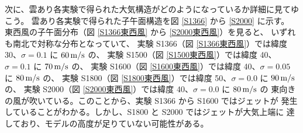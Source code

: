 \documentclass[body]{subfiles}
\begin{document}
次に、雲あり各実験で得られた大気構造がどのようになっているか詳細に見てゆこう。
雲あり各実験で得られた子午面構造を図 \ref{S1366} から \ref{S2000} に示す。
東西風の子午面分布（図 \ref{S1366東西風} から \ref{S2000東西風}）を見ると、
いずれも南北で対称な分布となっていて、
実験 S1366（図 \ref{S1366東西風}）では緯度 30\textdegree 、\(\sigma=0.1\) に \(60\hmu{m/s}\) の、
実験 S1500（図 \ref{S1500東西風}）では緯度 40\textdegree 、\(\sigma=0.1\) に \(70\hmu{m/s}\) の、
実験 S1600（図 \ref{S1600東西風}）では緯度 40\textdegree 、\(\sigma=0.05\) に \(80\hmu{m/s}\) の、
実験 S1800（図 \ref{S1800東西風}）では緯度 50\textdegree 、\(\sigma=0.0\) に \(90\hmu{m/s}\) の、
実験 S2000（図 \ref{S2000東西風}）では緯度 40\textdegree 、\(\sigma=0.0\) に \(80\hmu{m/s}\) の
東向きの風が吹いている。このことから、実験 S1366 から S1600 ではジェットが
発生していることがわかる。しかし、S1800 と S2000 ではジェットが大気上端に
達しており、モデルの高度が足りていない可能性がある。
\end{document}
